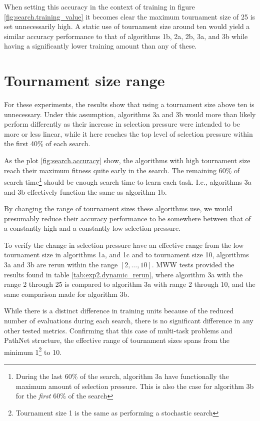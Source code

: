 When setting this accuracy in the context of training in figure \ref{fig:search.training_value} it becomes clear the maximum tournament size of 25 is set unnecessarily high. A static use of tournament size around ten would yield a similar accuracy performance to that of algorithms 1b, 2a, 2b, 3a, and 3b while having a significantly lower training amount than any of these.

\section{Tournament size range}
For these experiments, the results show that using a tournament size above ten is unnecessary. Under this assumption, algorithms 3a and 3b would more than likely perform differently as their increase in selection pressure were intended to be more or less linear, while it here reaches the top level of selection pressure within the first 40\% of each search. 

As the plot \ref{fig:search.accuracy} show, the algorithms with high tournament size reach their maximum fitness quite early in the search. The remaining 60\% of search time\footnote{During the last 60\% of the search, algorithm 3a have functionally the maximum amount of selection pressure. This is also the case for algorithm 3b for the \textit{first} 60\% of the search} should be enough search time to learn each task. I.e., algorithms 3a and 3b effectively function the same as algorithm 1b.

By changing the range of tournament sizes these algorithms use, we would presumably reduce their accuracy performance to be somewhere between that of a constantly high and a constantly low selection pressure.

To verify the change in selection pressure have an effective range from the low tournament size in algorithms 1a, and 1c and to tournament size 10, algorithms 3a and 3b are rerun within the range \([2,\dots,10]\). MWW tests provided the results found in table \ref{tab:exp2.dynamic_rerun}, where algorithm 3a with the range 2 through 25 is compared to algorithm 3a with range 2 through 10, and the same comparison made for algorithm 3b. 



While there is a distinct difference in training units because of the reduced number of evaluations during each search, there is no significant difference in any other tested metrics. Confirming that this case of multi-task problems and PathNet structure, the effective range of tournament sizes spans from the minimum 1\footnote{Tournament size 1 is the same as performing a stochastic search} to 10.

